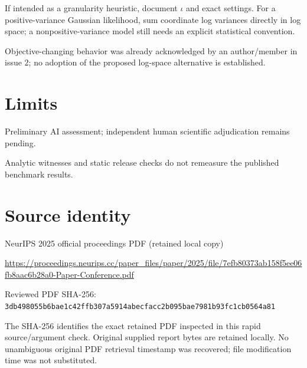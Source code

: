 \documentclass[11pt]{article}
\begin{document}
If intended as a granularity heuristic, document \(\iota\) and exact settings. For a positive-variance Gaussian likelihood, sum coordinate log variances directly in log space; a nonpositive-variance model still needs an explicit statistical convention.

Objective-changing behavior was already acknowledged by an author/member in issue 2; no adoption of the proposed log-space alternative is established.

\section*{Limits}

Preliminary AI assessment; independent human scientific adjudication remains pending.\par

Analytic witnesses and static release checks do not remeasure the published benchmark results.\par

\section*{Source identity}

NeurIPS 2025 official proceedings PDF (retained local copy)

\url{https://proceedings.neurips.cc/paper_files/paper/2025/file/7efb80373ab158f5ee06fb8aac6b28a0-Paper-Conference.pdf}

Reviewed PDF SHA-256: \nolinkurl{3db498055b6bae1c42ffb307a5914abecfacc2b095bae7981b93fc1cb0564a81}

The SHA-256 identifies the exact retained PDF inspected in this rapid source/argument check. Original supplied report bytes are retained locally. No unambiguous original PDF retrieval timestamp was recovered; file modification time was not substituted.
\end{document}
